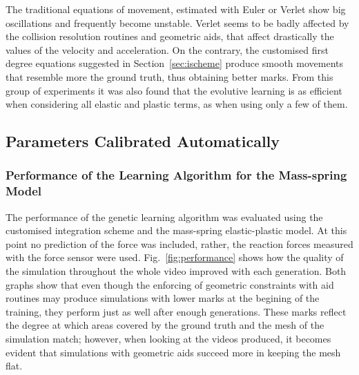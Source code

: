 \documentclass[journal]{IEEEtran}
\newcommand{\fref}[1]{Fig.~\ref{#1}}
\newcommand{\sref}[1]{Section~\ref{#1}}
\newcounter{algorithm}
\begin{document}
The traditional equations of movement, estimated with Euler or Verlet show big oscillations and frequently become unstable.  Verlet seems to be badly affected by the collision resolution routines and geometric aids, that affect drastically the values of the velocity and acceleration.  On the contrary, the customised first degree equations suggested in \sref{sec:ischeme} produce smooth movements that resemble more the ground truth, thus obtaining better marks.  From this group of experiments it was also found that the evolutive learning is as efficient when considering all elastic and plastic terms, as when using only a few of them.

\subsection{Parameters Calibrated Automatically}
\subsubsection{Performance of the Learning Algorithm for the Mass-spring Model}
The performance of the genetic learning algorithm was evaluated using the customised integration scheme and the mass-spring elastic-plastic model.  At this point no prediction of the force was included, rather, the reaction forces measured with the force sensor were used.  \fref{fig:performance} shows how the quality of the simulation throughout the whole video improved with each generation.  Both graphs show that even though the enforcing of geometric constraints with aid routines may produce simulations with lower marks at the begining of the training, they perform just as well after enough generations.  These marks reflect the degree at which areas covered by the ground truth and the mesh of the simulation match; however, when looking at the videos produced, it becomes evident that simulations with geometric aids succeed more in keeping the mesh flat. %
\end{document}
